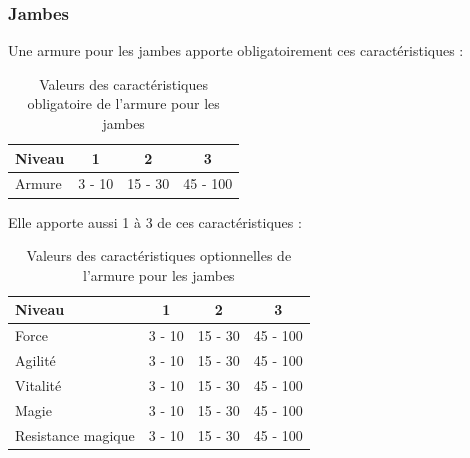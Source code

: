 \documentclass[11pt, a4paper, oneside]{report}
\begin{document}
\subsubsection{Jambes}
Une armure pour les jambes apporte obligatoirement ces caractéristiques :
\begin{table}[H]
\begin{center}
\begin{tabular}{| l | c | c | c |}
  \hline      
  Niveau 				& 1 & 2 & 3\\ \hline \hline
  Armure 				& 3 - 10 & 15 - 30 & 45 - 100\\ \hline
\end{tabular}
\caption{Valeurs des caractéristiques obligatoire de l'armure pour les jambes}
\end{center}
\end{table}
Elle apporte aussi 1 à 3 de ces caractéristiques :
\begin{table}[H]
\begin{center}
\begin{tabular}{| l | c | c | c |}
  \hline      
  Niveau 				& 1 & 2 & 3\\ \hline \hline                 
  Force 				& 3 - 10 & 15 - 30 & 45 - 100\\ \hline
  Agilité 				& 3 - 10 & 15 - 30 & 45 - 100\\ \hline
  Vitalité 				& 3 - 10 & 15 - 30 & 45 - 100\\ \hline
  Magie 				& 3 - 10 & 15 - 30 & 45 - 100\\ \hline
  Resistance magique 	& 3 - 10 & 15 - 30 & 45 - 100\\ \hline
\end{tabular}
\caption{Valeurs des caractéristiques optionnelles de l'armure pour les jambes}
\end{center}
\end{table}
\end{document}
